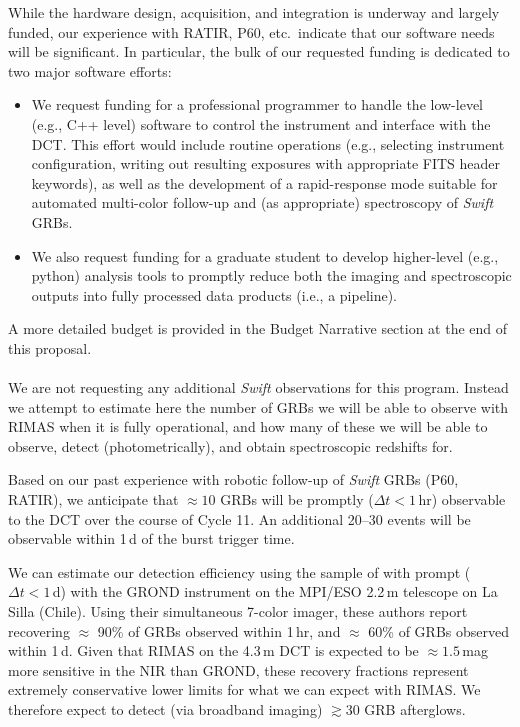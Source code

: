 \documentclass[letterpaper,11pt]{article}
\begin{document}
\smallskip

While the hardware design, acquisition, and integration is underway and largely 
funded, our experience with RATIR, P60, etc.~indicate that our software needs will
be significant.  In particular, the bulk of our requested funding is dedicated to 
two major software efforts:
\begin{itemize}
\item We request funding for a professional programmer to handle the low-level (e.g.,
C++ level) software to control the instrument and interface with the DCT.  This 
effort would include routine operations (e.g., selecting instrument configuration,
writing out resulting exposures with appropriate FITS header keywords), as well as 
the development of a rapid-response mode suitable for automated multi-color 
follow-up and (as appropriate) spectroscopy of \textit{Swift} GRBs.
\item We also request funding for a graduate student to develop higher-level (e.g.,
python) analysis tools to promptly reduce both the imaging and spectroscopic outputs
into fully processed data products (i.e., a pipeline).    
\end{itemize}
A more detailed budget is provided in the Budget Narrative section at the end of 
this proposal.\\



\smallskip\\
We are not requesting any additional \textit{Swift} observations for this program.
Instead we attempt to estimate here the number of GRBs we will be able to observe
with RIMAS when it is fully operational, and how many of these we will be able to 
observe, detect (photometrically), and obtain spectroscopic redshifts for. 

Based on our past experience with robotic follow-up of \textit{Swift} GRBs (P60,
RATIR), we anticipate that $\approx 10$ GRBs will be promptly ($\Delta t < 1$\,hr) 
observable to the DCT over the course of Cycle 11.  An additional 20--30 events will 
be observable within 1\,d of the burst trigger time.

We can estimate our detection efficiency using the sample of with prompt ($\Delta t
< 1$\,d) with the GROND instrument on the MPI/ESO 2.2\,m telescope on La Silla 
(Chile)\cite{gkk+11}.  Using their simultaneous 7-color imager, these authors report
recovering $\approx$ 90\% of GRBs observed within 1\,hr, and $\approx$ 60\% of
GRBs observed within 1\,d.  Given that RIMAS on the 4.3\,m DCT is expected to be
$\approx 1.5$\,mag more sensitive in the NIR than GROND, these recovery fractions 
represent extremely conservative lower limits for what we can expect with RIMAS. 
We therefore expect to detect (via broadband imaging) $\gtrsim 30$ GRB afterglows.
\end{document}
